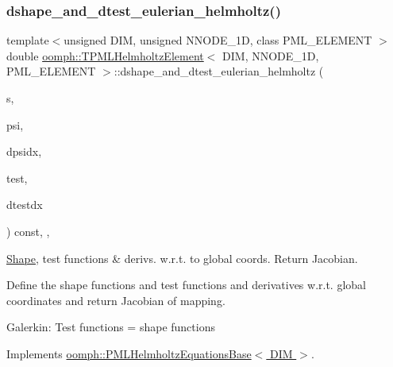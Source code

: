 \mbox{\label{classoomph_1_1TPMLHelmholtzElement_a6a4c48e090653977917c463c628b0585}} 
\subsubsection{\texorpdfstring{dshape\+\_\+and\+\_\+dtest\+\_\+eulerian\+\_\+helmholtz()}{dshape\_and\_dtest\_eulerian\_helmholtz()}}
{\footnotesize\ttfamily template$<$unsigned D\+IM, unsigned N\+N\+O\+D\+E\+\_\+1D, class P\+M\+L\+\_\+\+E\+L\+E\+M\+E\+NT $>$ \\
double \hyperlink{classoomph_1_1TPMLHelmholtzElement}{oomph\+::\+T\+P\+M\+L\+Helmholtz\+Element}$<$ D\+IM, N\+N\+O\+D\+E\+\_\+1D, P\+M\+L\+\_\+\+E\+L\+E\+M\+E\+NT $>$\+::dshape\+\_\+and\+\_\+dtest\+\_\+eulerian\+\_\+helmholtz (\begin{DoxyParamCaption}\item[{const \hyperlink{classoomph_1_1Vector}{Vector}$<$ double $>$ \&}]{s,  }\item[{\hyperlink{classoomph_1_1Shape}{Shape} \&}]{psi,  }\item[{\hyperlink{classoomph_1_1DShape}{D\+Shape} \&}]{dpsidx,  }\item[{\hyperlink{classoomph_1_1Shape}{Shape} \&}]{test,  }\item[{\hyperlink{classoomph_1_1DShape}{D\+Shape} \&}]{dtestdx }\end{DoxyParamCaption}) const\hspace{0.3cm}{\ttfamily [inline]}, {\ttfamily [protected]}, {\ttfamily [virtual]}}



\hyperlink{classoomph_1_1Shape}{Shape}, test functions \& derivs. w.\+r.\+t. to global coords. Return Jacobian. 

Define the shape functions and test functions and derivatives w.\+r.\+t. global coordinates and return Jacobian of mapping.

Galerkin\+: Test functions = shape functions 

Implements \hyperlink{classoomph_1_1PMLHelmholtzEquationsBase_ad8b68169a39c90b30fb4340ce654a350}{oomph\+::\+P\+M\+L\+Helmholtz\+Equations\+Base$<$ D\+I\+M $>$}.




